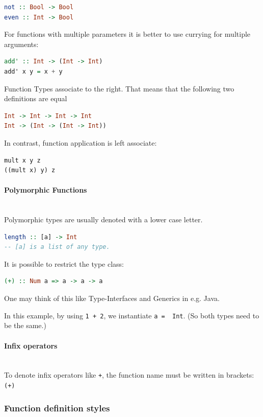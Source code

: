 \begin{lstlisting}[language=Haskell]
not :: Bool -> Bool
even :: Int -> Bool
\end{lstlisting}

For functions with multiple parameters it is better to use currying for multiple arguments:
\begin{lstlisting}[language=Haskell]
add' :: Int -> (Int -> Int)
add' x y = x + y
\end{lstlisting}

Function Types associate to the right. That means that the following two definitions are equal
\begin{lstlisting}[language=Haskell]
Int -> Int -> Int -> Int
Int -> (Int -> (Int -> Int))
\end{lstlisting}

In contrast, function application is left associate:
\begin{lstlisting}
mult x y z
((mult x) y) z
\end{lstlisting}


\paragraph{Polymorphic Functions} \hfill \\
Polymorphic types are usually denoted with a lower case letter.
\begin{lstlisting}[language=Haskell]
length :: [a] -> Int
-- [a] is a list of any type.
\end{lstlisting}

It is possible to restrict the type class:
\begin{lstlisting}[language=Haskell]
(+) :: Num a => a -> a -> a
\end{lstlisting}

One may think of this like Type-Interfaces and Generics in e.g. Java.

In this example, by using \lstinline|1 + 2|, we instantiate \lstinline|a =  Int|. (So both types need to be the same.)

\paragraph{Infix operators} \hfill \\

To denote infix operators like \lstinline|+|, the function name must be written in brackets: \lstinline|(+)|

\subsubsection{Function definition styles}

